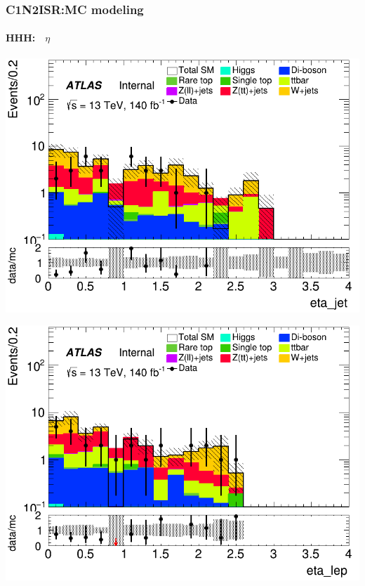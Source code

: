 \documentclass[usenames,dvipsnames]{beamer}
\begin{document}
\begin{frame}
\frametitle{C1N2ISR:MC modeling}
\framesubtitle{HHH:$\quad\eta$}
    \begin{minipage}{0.32\textwidth}
        \centering
        \includegraphics[width=\textwidth]{graphics/HHH_met/HHH_met_eta_jet.png}
    \end{minipage}
    \hfill
    \begin{minipage}{0.32\textwidth}
        \centering
        \includegraphics[width=\textwidth]{graphics/HHH_met/HHH_met_eta_lep.png}
    \end{minipage}
    \hfill
    \begin{minipage}{0.32\textwidth}
        \centering

\end{minipage}
\end{frame}
\end{document}

